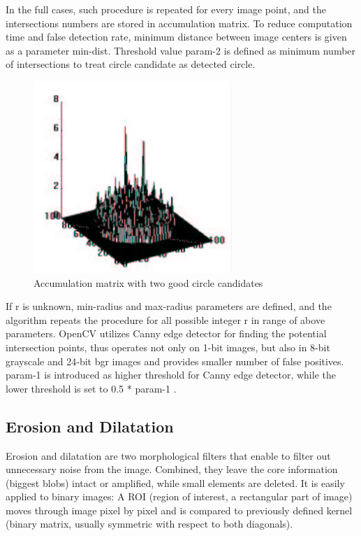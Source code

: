 \documentclass[12pt,twoside,a4paper]{article}
\begin{document}
In the full cases, such procedure is repeated for every image point, and the intersections numbers are stored in accumulation matrix.\cite{hgt}
To reduce computation time and false detection rate, minimum distance between image centers is given as a parameter min-dist.
Threshold value param-2 is defined as minimum number of intersections to treat circle candidate as detected circle.
 
\begin{figure}[H]
\centering
\includegraphics[width=0.4\paperwidth]{accu}
\caption{Accumulation matrix with two good circle candidates\cite{hgt}}
\end{figure}

If r is unknown, min-radius and max-radius parameters are defined, and the algorithm repeats the procedure for all possible integer r in range of above parameters.
OpenCV utilizes Canny edge detector for finding the potential intersection points, thus operates not only on 1-bit images, but also in 8-bit grayscale and 24-bit bgr images and provides smaller number of false positives.\cite{mastercv}
param-1 is introduced as higher threshold for Canny edge detector, while the lower threshold is set to 0.5 * param-1\cite{fd} .


\subsection{Erosion and Dilatation}
Erosion and dilatation are two morphological filters that enable to filter out unnecessary noise from the image.
Combined, they leave the core information (biggest blobs) intact or amplified, while small elements are deleted.
It is easily applied to binary images:
A ROI (region of interest, a rectangular part of image) moves through image pixel by pixel and is compared to previously defined kernel (binary matrix, usually symmetric with respect to both diagonals).
\end{document}
